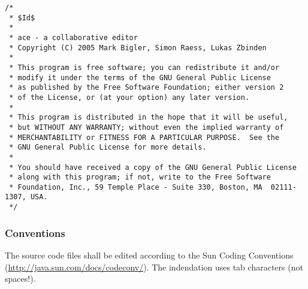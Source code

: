 \documentclass[11pt,a4paper]{article}
\begin{document}
\small{
\begin{verbatim}
/*
 * $Id$
 *
 * ace - a collaborative editor
 * Copyright (C) 2005 Mark Bigler, Simon Raess, Lukas Zbinden
 *
 * This program is free software; you can redistribute it and/or
 * modify it under the terms of the GNU General Public License
 * as published by the Free Software Foundation; either version 2
 * of the License, or (at your option) any later version.
 *
 * This program is distributed in the hope that it will be useful,
 * but WITHOUT ANY WARRANTY; without even the implied warranty of
 * MERCHANTABILITY or FITNESS FOR A PARTICULAR PURPOSE.  See the
 * GNU General Public License for more details.
 *
 * You should have received a copy of the GNU General Public License
 * along with this program; if not, write to the Free Software
 * Foundation, Inc., 59 Temple Place - Suite 330, Boston, MA  02111-1307, USA.
 */
\end{verbatim}
}

\subsubsection*{Conventions}

The source code files shall be edited according to the Sun Coding Conventions (\href{http://java.sun.com/docs/codeconv/}{http://java.sun.com/docs/codeconv/}).
The indendation uses tab characters (not spaces!).
\end{document}

